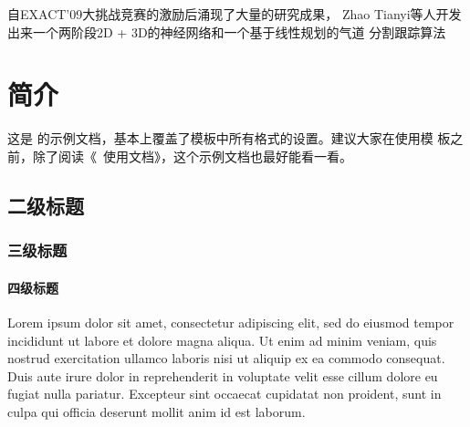 	自EXACT'09大挑战竞赛的激励后涌现了大量的研究成果， Zhao Tianyi等人\cite{Zhao2019BronchusSA}开发出来一个两阶段2D + 3D的神经网络和一个基于线性规划的气道
	分割跟踪算法




























































\chapter{简介}

这是 \sjtuthesis 的示例文档，基本上覆盖了模板中所有格式的设置。建议大家在使用模
板之前，除了阅读《\sjtuthesis\ 使用文档》，这个示例文档也最好能看一看。

\section{二级标题}

\subsection{三级标题}

\subsubsection{四级标题}

Lorem ipsum dolor sit amet, consectetur adipiscing elit, sed do eiusmod tempor
incididunt ut labore et dolore magna aliqua. Ut enim ad minim veniam, quis
nostrud exercitation ullamco laboris nisi ut aliquip ex ea commodo consequat.
Duis aute irure dolor in reprehenderit in voluptate velit esse cillum dolore eu
fugiat nulla pariatur. Excepteur sint occaecat cupidatat non proident, sunt in
culpa qui officia deserunt mollit anim id est laborum.

